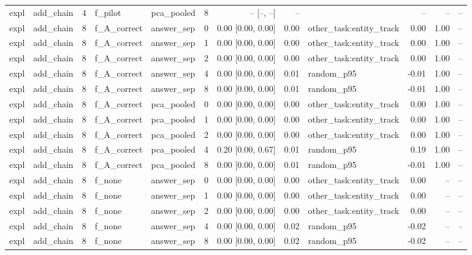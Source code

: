 \begin{tabular}{llrllrrrlrrr}
expl & add\_chain & 4 & f\_pilot & pca\_pooled & 8 & -- [--, --] & -- &  & -- & -- & -- \\
expl & add\_chain & 8 & f\_A\_correct & answer\_sep & 0 & 0.00 [0.00, 0.00] & 0.00 & other\_task:entity\_track & 0.00 & 1.00 & -- \\
expl & add\_chain & 8 & f\_A\_correct & answer\_sep & 1 & 0.00 [0.00, 0.00] & 0.00 & other\_task:entity\_track & 0.00 & 1.00 & -- \\
expl & add\_chain & 8 & f\_A\_correct & answer\_sep & 2 & 0.00 [0.00, 0.00] & 0.00 & other\_task:entity\_track & 0.00 & 1.00 & -- \\
expl & add\_chain & 8 & f\_A\_correct & answer\_sep & 4 & 0.00 [0.00, 0.00] & 0.01 & random\_p95 & -0.01 & 1.00 & -- \\
expl & add\_chain & 8 & f\_A\_correct & answer\_sep & 8 & 0.00 [0.00, 0.00] & 0.01 & random\_p95 & -0.01 & 1.00 & -- \\
expl & add\_chain & 8 & f\_A\_correct & pca\_pooled & 0 & 0.00 [0.00, 0.00] & 0.00 & other\_task:entity\_track & 0.00 & 1.00 & -- \\
expl & add\_chain & 8 & f\_A\_correct & pca\_pooled & 1 & 0.00 [0.00, 0.00] & 0.00 & other\_task:entity\_track & 0.00 & 1.00 & -- \\
expl & add\_chain & 8 & f\_A\_correct & pca\_pooled & 2 & 0.00 [0.00, 0.00] & 0.00 & other\_task:entity\_track & 0.00 & 1.00 & -- \\
expl & add\_chain & 8 & f\_A\_correct & pca\_pooled & 4 & 0.20 [0.00, 0.67] & 0.01 & random\_p95 & 0.19 & 1.00 & -- \\
expl & add\_chain & 8 & f\_A\_correct & pca\_pooled & 8 & 0.00 [0.00, 0.00] & 0.01 & random\_p95 & -0.01 & 1.00 & -- \\
expl & add\_chain & 8 & f\_none & answer\_sep & 0 & 0.00 [0.00, 0.00] & 0.00 & other\_task:entity\_track & 0.00 & -- & -- \\
expl & add\_chain & 8 & f\_none & answer\_sep & 1 & 0.00 [0.00, 0.00] & 0.00 & other\_task:entity\_track & 0.00 & -- & -- \\
expl & add\_chain & 8 & f\_none & answer\_sep & 2 & 0.00 [0.00, 0.00] & 0.00 & other\_task:entity\_track & 0.00 & -- & -- \\
expl & add\_chain & 8 & f\_none & answer\_sep & 4 & 0.00 [0.00, 0.00] & 0.02 & random\_p95 & -0.02 & -- & -- \\
expl & add\_chain & 8 & f\_none & answer\_sep & 8 & 0.00 [0.00, 0.00] & 0.02 & random\_p95 & -0.02 & -- & -- \\

\end{tabular}
